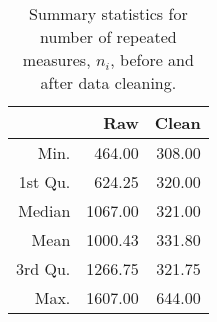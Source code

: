 \begin{table}[ht]
\centering
\begin{tabular}{rrr}
  \hline
 & Raw & Clean \\ 
  \hline
Min. & 464.00 & 308.00 \\ 
  1st Qu. & 624.25 & 320.00 \\ 
  Median & 1067.00 & 321.00 \\ 
  Mean & 1000.43 & 331.80 \\ 
  3rd Qu. & 1266.75 & 321.75 \\ 
  Max. & 1607.00 & 644.00 \\ 
   \hline
\end{tabular}
\caption{Summary statistics for number of repeated measures, $n_i$, before
                  and after data cleaning.} 
\label{tab:meta}
\end{table}
